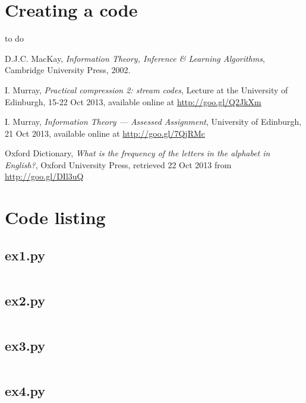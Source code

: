 \documentclass[10pt,a4paper,oneside,onecolumn]{article}
\begin{document}
\section{Creating a code}\label{sec:ex8}

to do %


\begin{thebibliography}{9}

    D.J.C. MacKay,
    \emph{Information Theory, Inference \& Learning Algorithms},
    Cambridge University Press,
    2002.

    I. Murray,
    \emph{Practical compression 2: stream codes},
    Lecture at the University of Edinburgh,
    15-22 Oct 2013,
    available online at \url{http://goo.gl/Q2JkXm}

    I. Murray,
    \emph{Information Theory — Assessed Assignment},
    University of Edinburgh,
    21 Oct 2013,
    available online at \url{http://goo.gl/7QjRMc}

    Oxford Dictionary,
    \emph{What is the frequency of the letters in the alphabet in English?},
    Oxford University Press,
    retrieved 22 Oct 2013 from \url{http://goo.gl/DIl3uQ}

\end{thebibliography}


\onecolumn
\appendixpage
\appendix

\section{Code listing}

\subsection{ex1.py}\label{app:ex1}
\inputminted{python}{../src/ex1.py}

\subsection{ex2.py}\label{app:ex2}
\inputminted{python}{../src/ex2.py}

\subsection{ex3.py}\label{app:ex3}
\inputminted{python}{../src/ex3.py}

\subsection{ex4.py}\label{app:ex4}
\inputminted{python}{../src/ex4.py}
\end{document}
